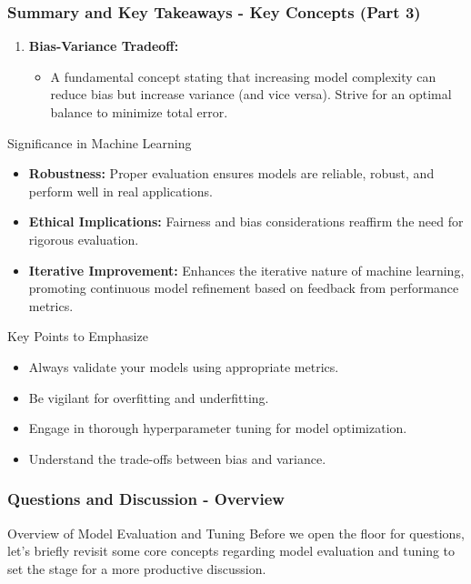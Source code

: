 \documentclass[aspectratio=169]{beamer}
\begin{document}
\begin{frame}[fragile]
    \frametitle{Summary and Key Takeaways - Key Concepts (Part 3)}
    \begin{enumerate}[resume]
        \item \textbf{Bias-Variance Tradeoff:}
        \begin{itemize}
            \item A fundamental concept stating that increasing model complexity can reduce bias but increase variance (and vice versa). Strive for an optimal balance to minimize total error.
        \end{itemize}
    \end{enumerate}
    
    \begin{block}{Significance in Machine Learning}
        \begin{itemize}
            \item \textbf{Robustness:} Proper evaluation ensures models are reliable, robust, and perform well in real applications.
            \item \textbf{Ethical Implications:} Fairness and bias considerations reaffirm the need for rigorous evaluation.
            \item \textbf{Iterative Improvement:} Enhances the iterative nature of machine learning, promoting continuous model refinement based on feedback from performance metrics.
        \end{itemize}
    \end{block}

    \begin{block}{Key Points to Emphasize}
        \begin{itemize}
            \item Always validate your models using appropriate metrics.
            \item Be vigilant for overfitting and underfitting.
            \item Engage in thorough hyperparameter tuning for model optimization.
            \item Understand the trade-offs between bias and variance.
        \end{itemize}
    \end{block}
\end{frame}

\begin{frame}[fragile]
  \frametitle{Questions and Discussion - Overview}
  \begin{block}{Overview of Model Evaluation and Tuning}
    Before we open the floor for questions, let's briefly revisit some core concepts regarding model evaluation and tuning to set the stage for a more productive discussion.
  \end{block}
\end{frame}
\end{document}
